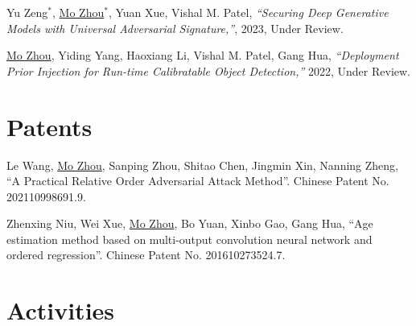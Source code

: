\documentclass[10pt,margin,line,pifont,palatino,courier]{res}
\begin{document}
\begin{resume}
\begin{enumerate}[noitemsep, leftmargin=*, label={[X0{\arabic*}]}]
\item Yu Zeng$^*$, \underline{Mo Zhou}$^*$, Yuan Xue, Vishal M. Patel,
\reversemarginpar{}
\textit{``Securing Deep Generative Models with Universal Adversarial Signature,''},
2023, Under Review.

\item \underline{Mo Zhou}, Yiding Yang, Haoxiang Li, Vishal M. Patel, Gang Hua,
\reversemarginpar{}
\textit{``Deployment Prior Injection for Run-time Calibratable Object Detection,''}
2022, Under Review.

\end{enumerate}

\section{\sc Patents}

\begin{enumerate}[noitemsep, leftmargin=*, label={[P0{\arabic*}]}]

\item Le Wang, \underline{Mo Zhou}, Sanping Zhou, Shitao Chen, Jingmin Xin, Nanning Zheng,
	``A Practical Relative Order Adversarial Attack Method''.
	Chinese Patent No. 202110998691.9.

\item Zhenxing Niu, Wei Xue, \underline{Mo Zhou}, Bo Yuan, Xinbo Gao, Gang Hua,
	``Age estimation method based on multi-output convolution neural
	network and ordered regression''. Chinese Patent No. 201610273524.7.

\end{enumerate}

\section{\sc Activities}


\end{resume}
\end{document}
